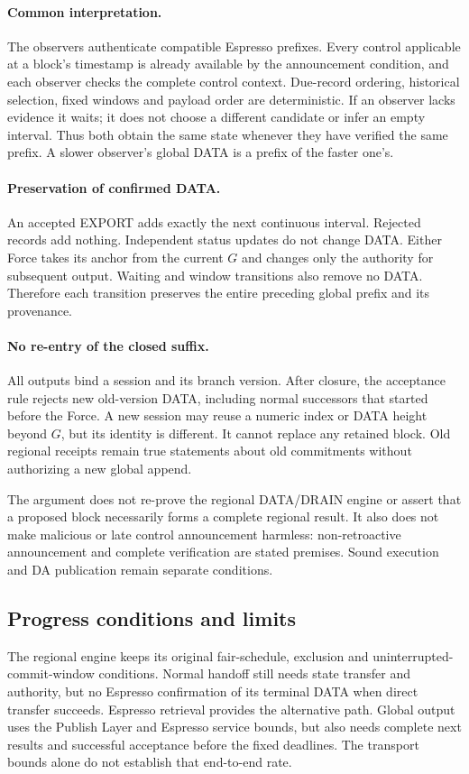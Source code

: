 \documentclass[11pt,a4paper]{article}
\begin{document}
\paragraph{Common interpretation.}
The observers authenticate compatible Espresso prefixes. Every control
applicable at a block's timestamp is already available by the
announcement condition, and each observer checks the complete control
context. Due-record ordering, historical selection, fixed windows and
payload order are deterministic. If an observer lacks evidence it waits;
it does not choose a different candidate or infer an empty interval.
Thus both obtain the same state whenever they have verified the same
prefix. A slower observer's global DATA is a prefix of the faster one's.

\paragraph{Preservation of confirmed DATA.}
An accepted EXPORT adds exactly the next continuous interval. Rejected
records add nothing. Independent status updates do not change DATA.
Either Force takes its anchor from the current $G$ and changes only the
authority for subsequent output. Waiting and window transitions also
remove no DATA. Therefore each transition preserves the entire preceding
global prefix and its provenance.

\paragraph{No re-entry of the closed suffix.}
All outputs bind a session and its branch version. After closure, the
acceptance rule rejects new old-version DATA, including normal successors
that started before the Force. A new session may reuse a numeric index
or DATA height beyond $G$, but its identity is different. It cannot
replace any retained block. Old regional receipts remain true statements
about old commitments without authorizing a new global append.

The argument does not re-prove the regional DATA/DRAIN engine or assert
that a proposed block necessarily forms a complete regional result. It also does not
make malicious or late control announcement harmless: non-retroactive
announcement and complete verification are stated premises. Sound
execution and DA publication remain separate conditions.

\subsection{Progress conditions and limits}
The regional engine keeps its original fair-schedule, exclusion and
uninterrupted-commit-window conditions. Normal handoff still needs
state transfer and authority, but no Espresso confirmation of its
terminal DATA when direct transfer succeeds. Espresso retrieval provides
the alternative path. Global output uses the Publish Layer and Espresso
service bounds, but also needs complete next results and successful
acceptance before the fixed deadlines. The transport bounds alone do not
establish that end-to-end rate.
\end{document}
